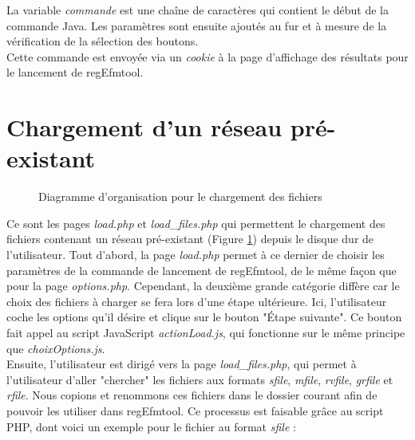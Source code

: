 La variable \textit{commande} est une chaîne de caractères qui contient le début de la commande Java. Les paramètres sont ensuite ajoutés au fur et à mesure de la vérification de la sélection des boutons. \\

Cette commande est envoyée via un \textit{cookie} à la page d'affichage des résultats pour le lancement de regEfmtool. 

\section{Chargement d'un réseau pré-existant}

\begin{figure}[!ht]
	\begin{center}
		\caption{Diagramme d'organisation pour le chargement des fichiers}
  		\label{DiagLoad}
  	\end{center}	
\end{figure}

Ce sont les pages \emph{load.php} et \emph{load\_files.php} qui permettent le chargement des fichiers contenant un réseau pré-existant (Figure \ref{DiagLoad}) depuis le disque dur de l'utilisateur. Tout d'abord, la page \emph{load.php} permet à ce dernier de choisir les paramètres de la commande de lancement de regEfmtool, de le même façon que pour la page \emph{options.php}. Cependant, la deuxième grande catégorie diffère car le choix des fichiers à charger se fera lors d'une étape ultérieure. Ici, l'utilisateur coche les options qu'il désire et clique sur le bouton "Étape suivante". Ce bouton fait appel au script JavaScript \emph{actionLoad.js}, qui fonctionne sur le même principe que \emph{choixOptions.js}. \\

Ensuite, l'utilisateur est dirigé vers la page \emph{load\_files.php}, qui permet à l'utilisateur d'aller "chercher" les fichiers aux formats \textit{sfile}, \textit{mfile}, \textit{rvfile}, \textit{grfile} et \textit{rfile}. Nous copions et renommons ces fichiers dans le dossier courant afin de pouvoir les utiliser dans regEfmtool. Ce processus est faisable grâce au script PHP, dont voici un exemple pour le fichier au format \textit{sfile} :\\

